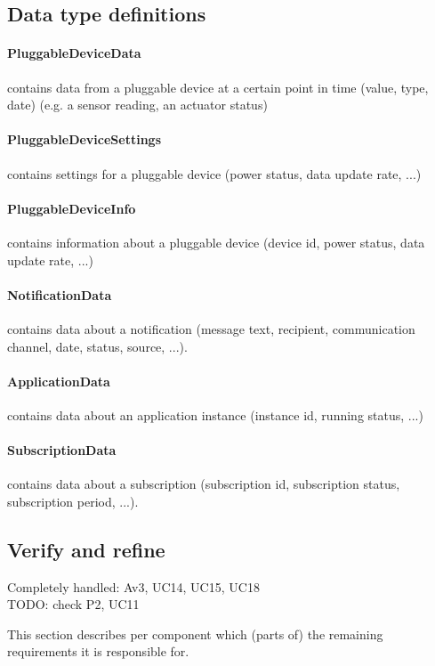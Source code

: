 \subsection{Data type definitions}
    \paragraph{PluggableDeviceData}
              contains data from a pluggable device at a certain point in time
              (value, type, date) (e.g. a sensor reading, an actuator status)
    \paragraph{PluggableDeviceSettings}
              contains settings for a pluggable device (power status,
              data update rate, ...)
    \paragraph{PluggableDeviceInfo}
              contains information about a pluggable device (device id,
              power status, data update rate, ...)

    \paragraph{NotificationData}
              contains data about a notification (message text, recipient,
              communication channel, date, status, source, ...).

    \paragraph{ApplicationData}
              contains data about an application instance (instance id, running status, ...)
    \paragraph{SubscriptionData}
              contains data about a subscription (subscription id, subscription status,
              subscription period, ...).


\subsection{Verify and refine}
    Completely handled: Av3, UC14, UC15, UC18 \\
    TODO: check P2, UC11

    \noindent This section describes per component which (parts of) the remaining
    requirements it is responsible for.

